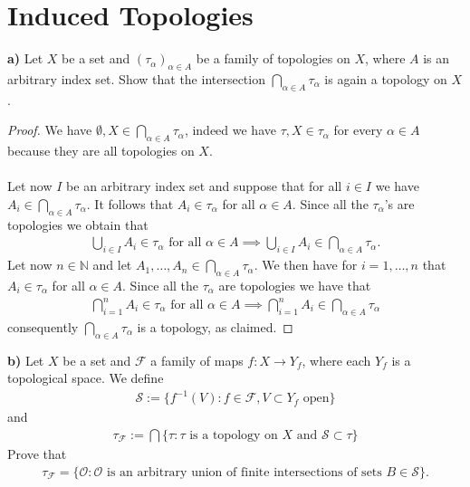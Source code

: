 \documentclass[12pt,a4paper]{article}
\begin{document}
\section{Induced Topologies}
\textbf{a)} Let $X$ be a set and $(\tau_\alpha)_{ \alpha \in A}$ be a family of topologies on $X$, where $A$ is an arbitrary index set. Show that the intersection $\bigcap_{ \alpha \in A} \tau_\alpha$ is again a topology on $X$. 
\begin{proof}
We have $\emptyset, X \in \bigcap_{ \alpha \in A} \tau_\alpha$, indeed we have $\tau, X \in \tau_\alpha$ for every $\alpha \in A$ because they are all topologies on $X$. 
\\\\
Let now $I$ be an arbitrary index set and suppose that for all $i \in I$ we have $A_i \in \bigcap_{ \alpha \in A} \tau_\alpha$. It follows that $A_i \in \tau_\alpha$ for all $\alpha \in A$. Since all the $\tau_\alpha$'s are topologies we obtain that \begin{align*}
\bigcup_{i \in I} A_i \in \tau_\alpha \text{ for all } \alpha \in A \implies \bigcup_{i \in I } A_i \in \bigcap_{ \alpha \in A} \tau_\alpha.
\end{align*}
Let now $n \in \mathbb{N}$ and let $A_1, \dots , A_n \in \bigcap_{ \alpha \in A} \tau_\alpha$. We then have for $i=1,\dots ,n$ that $A_i \in \tau_\alpha$ for all $\alpha \in A$. Since all the $\tau_\alpha$ are topologies we have that 
\begin{align*}
\bigcap_{i=1}^n A_i \in \tau_\alpha \text{ for all } \alpha \in A \implies \bigcap_{i=1}^n A_i \in \bigcap_{ \alpha \in A} \tau_\alpha
\end{align*}
consequently $\bigcap_{ \alpha \in A} \tau_\alpha$ is a topology, as claimed. 
\end{proof}
\noindent \textbf{b)} Let $X$ be a set and $\mathcal{F}$ a family of maps $f:X \to Y_f$, where each $Y_f$ is a topological space. We define
\begin{align*}
\mathcal{S}:= \lbrace f^{-1}(V): f \in \mathcal{F}, V \subset Y_f \text{ open} \rbrace 
\end{align*}
and
\begin{align*}
\tau_{\mathcal{F}} := \bigcap \lbrace \tau : \tau \text{ is a topology on $X$ and } \mathcal{S} \subset \tau \rbrace 
\end{align*}
Prove that 
\begin{align*}
\tau_{\mathcal{F}} = \lbrace \mathcal{O}: \mathcal{O} \text{ is an arbitrary union of finite intersections of sets } B \in \mathcal{S} \rbrace. 
\end{align*}
\end{document}
